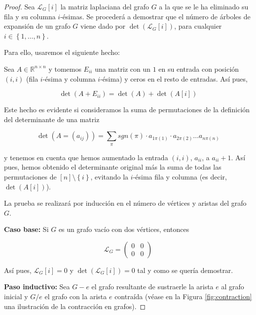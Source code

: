 \begin{proof}
Sea $\mathcal{L}_G[i]$ la matriz laplaciana del grafo $G$ a la que se le ha eliminado su fila y su columna $i$-ésimas. Se procederá a demostrar que el número de árboles de expansión de un grafo $G$ viene dado por $\det(\mathcal{L}_G[i])$, para cualquier $i \in \left\lbrace 1,\dots,n \right\rbrace$.

Para ello, usaremos el siguiente hecho:

\begin{proposition}\label{prop:fact}
Sea $A \in \mathbb{R}^{n\times n}$ y tomemos $E_{ii}$ una matriz con un $1$ en su entrada con posición $(i,i)$ (fila $i$-ésima y columna $i$-ésima) y ceros en el resto de entradas. Así pues,

\begin{equation}
\det(A+E_{ii}) = \det(A)+\det(A[i])
\end{equation}

Este hecho es evidente si consideramos la suma de permutaciones de la definición del determinante de una matriz

\begin{equation}
\det(A = (a_{ij})) = \sum_{\pi}{sgn(\pi) \cdot a_{1\pi(1)} \cdot a_{2\pi(2)} \dots a_{n\pi(n)}}
\end{equation}

y tenemos en cuenta que hemos aumentado la entrada $(i,i)$, $a_{ii}$, a $a_{ii}+1$. Así pues, hemos obtenido el determinante original más la suma de todas las permutaciones de $[n]\setminus \left\lbrace i \right\rbrace$, evitando la $i$-ésima fila y columna (es decir, $\det(A[i])$).
\end{proposition}

La prueba se realizará por inducción en el número de vértices y aristas del grafo $G$.

\textbf{Caso base:} Si $G$ es un grafo vacío con dos vértices, entonces

\begin{equation}
\mathcal{L}_G =
\begin{pmatrix}
0 & 0 \\
0 & 0
\end{pmatrix}
\end{equation}

Así pues, $\mathcal{L}_G[i] = 0$ y $\det(\mathcal{L}_G[i]) = 0$ tal y como se quería demostrar.

\textbf{Paso inductivo:} Sea $G-e$ el grafo resultante de sustraerle la arista $e$ al grafo inicial y $G/e$ el grafo con la arista $e$ contraída (véase en la Figura \ref{fig:contraction} una ilustración de la contracción en grafos).


\end{proof}
